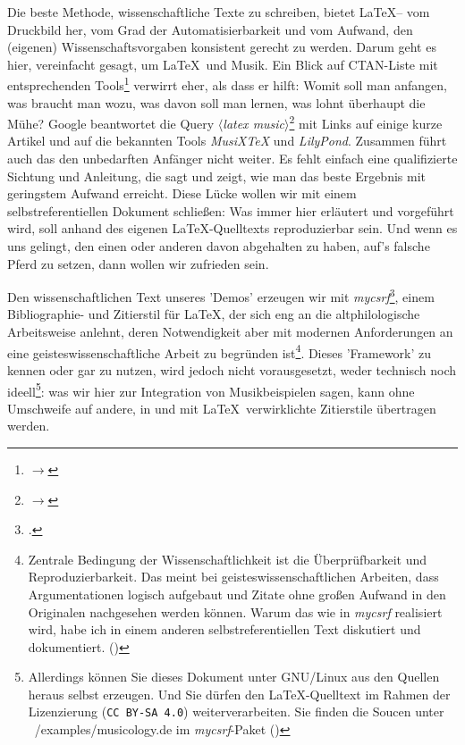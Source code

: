Die beste Methode, wissenschaftliche Texte zu schreiben, bietet \LaTeX -- vom
Druckbild her, vom Grad der Automatisierbarkeit und vom Aufwand, den (eigenen)
Wissenschaftsvorgaben konsistent gerecht zu werden. Darum geht es hier,
vereinfacht gesagt, um \LaTeX\ und Musik. Ein Blick auf CTAN-Liste mit
entsprechenden Tools\footnote{$\rightarrow$
} verwirrt eher, als dass er
hilft: Womit soll man anfangen, was braucht man wozu, was davon soll man lernen,
was lohnt überhaupt die Mühe? Google beantwortet die Query
$\langle$\textit{latex music}$\rangle$\footnote{$\rightarrow$
} mit Links auf einige kurze
Artikel und auf die bekannten Tools \textit{MusiX\TeX} und \textit{LilyPond}.
Zusammen führt auch das den unbedarften Anfänger nicht weiter. Es fehlt einfach
eine qualifizierte Sichtung und Anleitung, die sagt und zeigt, wie man das beste
Ergebnis mit geringstem Aufwand erreicht. Diese Lücke wollen wir mit einem
selbstreferentiellen Dokument schließen: Was immer hier erläutert und vorgeführt
wird, soll anhand des eigenen \LaTeX-Quelltexts reproduzierbar sein. Und wenn es
uns gelingt, den einen oder anderen davon abgehalten zu haben, auf's falsche
Pferd zu setzen, dann wollen wir zufrieden sein.

Den wissenschaftlichen Text unseres 'Demos' erzeugen wir mit
\textit{mycsrf}\footcite[vgl.][\nopage wp]{Reincke2018a}, einem Bibliographie- und
Zitierstil für \LaTeX, der sich eng an die altphilologische Arbeitsweise
anlehnt, deren Notwendigkeit aber mit modernen Anforderungen an eine
geisteswissenschaftliche Arbeit zu begründen ist\footnote{Zentrale Bedingung der
Wissenschaftlichkeit ist die Überprüfbarkeit und Reproduzierbarkeit. Das meint
bei geisteswissenschaftlichen Arbeiten, dass Argumentationen logisch aufgebaut
und Zitate ohne großen Aufwand in den Originalen nachgesehen werden können.
Warum das wie in \textit{mycsrf} realisiert wird, habe ich in einem anderen
selbstreferentiellen Text diskutiert und dokumentiert. (\cite[Vgl.
dazu][1ff]{Reincke2018b})}. Dieses 'Framework' zu kennen oder gar zu nutzen,
wird jedoch nicht vorausgesetzt, weder technisch noch ideell\footnote{Allerdings
können Sie dieses Dokument unter GNU/Linux aus den Quellen heraus selbst
erzeugen. Und Sie dürfen den \LaTeX-Quelltext im Rahmen der Lizenzierung
(\texttt{CC BY-SA 4.0}) weiterverarbeiten. Sie finden die Soucen unter
~/examples/musicology.de im \textit{mycsrf}-Paket (\cite[Vgl. dazu][\nopage
wp]{Reincke2019a})}: was wir hier zur Integration von
Musikbeispielen sagen, kann ohne Umschweife auf andere, in und mit \LaTeX\
verwirklichte Zitierstile übertragen werden.

